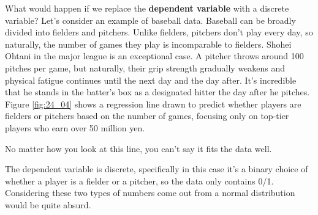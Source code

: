 \documentclass{ltjsbook}
\begin{document}
What would happen if we replace the \textbf{dependent variable} with a discrete variable?
Let's consider an example of baseball data. Baseball can be broadly divided into fielders and pitchers. Unlike fielders, pitchers don't play every day, so naturally, the number of games they play is incomparable to fielders. Shohei Ohtani in the major league is an exceptional case. A pitcher throws around 100 pitches per game, but naturally, their grip strength gradually weakens and physical fatigue continues until the next day and the day after. It's incredible that he stands in the batter's box as a designated hitter the day after he pitches.
Figure \ref{fig:24_04} shows a regression line drawn to predict whether players are fielders or pitchers based on the number of games, focusing only on top-tier players who earn over 50 million yen.

No matter how you look at this line, you can't say it fits the data well.

The dependent variable is discrete, specifically in this case it's a binary choice of whether a player is a fielder or a pitcher, so the data only contains 0/1. Considering these two types of numbers come out from a normal distribution would be quite absurd.
\end{document}
